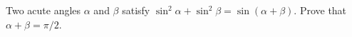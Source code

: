 Two acute angles $\alpha$ and $\beta$ satisfy $\sin^2\alpha + \sin^2\beta = \sin(\alpha + \beta)$. Prove that $\alpha + \beta = \pi/2$.
